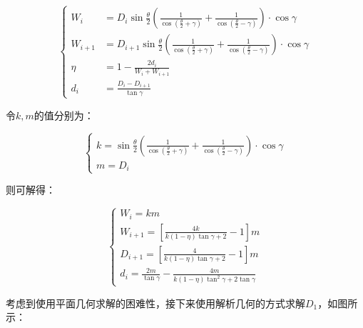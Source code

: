 \begin{equation}
    \begin{cases}
        W_i       & = D_i\sin\frac{\theta}{2}\left(\frac{1}{\cos(\frac{\theta}{2}+\gamma)} + \frac{1}{\cos(\frac{\theta}{2}-\gamma)}\right) \cdot \cos \gamma       \\
        W_{i + 1} & = D_{i + 1}\sin\frac{\theta}{2}\left(\frac{1}{\cos(\frac{\theta}{2}+\gamma)} + \frac{1}{\cos(\frac{\theta}{2}-\gamma)}\right) \cdot \cos \gamma \\
        \eta      & = 1 - \frac{2d_i}{W_i + W_{i + 1}}                                                                                                              \\
        d_i       & = \frac{D_i - D_{i + 1}}{\tan \gamma}
    \end{cases}
\end{equation}

令$k, m$的值分别为：

\begin{equation}
    \begin{cases}
        k =
        \sin\frac{\theta}{2}\left(
        \frac{1}{\cos(\frac{\theta}{2}+\gamma)} +
        \frac{1}{\cos(\frac{\theta}{2}-\gamma)}
        \right) \cdot \cos \gamma \\
        m = D_i
    \end{cases}
\end{equation}

则可解得：

\begin{equation}
    \begin{cases}
        W_i = km                                                             \\
        W_{i + 1} = \left[\frac{4k}{k(1 - \eta) \tan \gamma + 2} - 1\right]m \\
        D_{i + 1} = \left[\frac{4}{k(1 - \eta) \tan \gamma + 2} - 1\right]m  \\
        d_i = \frac{2m}{\tan \gamma} - \frac{4m}{k(1-\eta) \tan^2 \gamma + 2 \tan \gamma}
    \end{cases}
\end{equation}

考虑到使用平面几何求解的困难性，接下来使用解析几何的方式求解$D_1$，如图所示：

